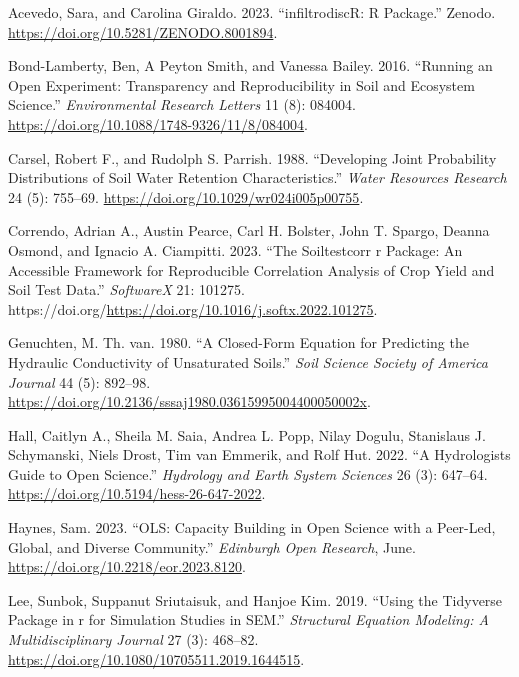 \documentclass[
]{article}
\newlength{\cslhangindent}
\newlength{\cslentryspacingunit} %
\newenvironment{CSLReferences}[2] %
 {%
  \setlength{\parindent}{0pt}
  \ifodd #1
  \let\oldpar\par
  \def\par{\hangindent=\cslhangindent\oldpar}
  \fi
  \setlength{\parskip}{#2\cslentryspacingunit}
 }%
 {}
\begin{document}
\hypertarget{refs}{}
\begin{CSLReferences}{1}{0}
\leavevmode{}%
Acevedo, Sara, and Carolina Giraldo. 2023. {``infiltrodiscR: R
Package.''} Zenodo. \url{https://doi.org/10.5281/ZENODO.8001894}.

\leavevmode{}%
Bond-Lamberty, Ben, A Peyton Smith, and Vanessa Bailey. 2016. {``Running
an Open Experiment: Transparency and Reproducibility in Soil and
Ecosystem Science.''} \emph{Environmental Research Letters} 11 (8):
084004. \url{https://doi.org/10.1088/1748-9326/11/8/084004}.

\leavevmode{}%
Carsel, Robert F., and Rudolph S. Parrish. 1988. {``Developing Joint
Probability Distributions of Soil Water Retention Characteristics.''}
\emph{Water Resources Research} 24 (5): 755--69.
\url{https://doi.org/10.1029/wr024i005p00755}.

\leavevmode{}%
Correndo, Adrian A., Austin Pearce, Carl H. Bolster, John T. Spargo,
Deanna Osmond, and Ignacio A. Ciampitti. 2023. {``The Soiltestcorr r
Package: An Accessible Framework for Reproducible Correlation Analysis
of Crop Yield and Soil Test Data.''} \emph{SoftwareX} 21: 101275.
https://doi.org/\url{https://doi.org/10.1016/j.softx.2022.101275}.

\leavevmode{}%
Genuchten, M. Th. van. 1980. {``A Closed-Form Equation for Predicting
the Hydraulic Conductivity of Unsaturated Soils.''} \emph{Soil Science
Society of America Journal} 44 (5): 892--98.
\url{https://doi.org/10.2136/sssaj1980.03615995004400050002x}.

\leavevmode{}%
Hall, Caitlyn A., Sheila M. Saia, Andrea L. Popp, Nilay Dogulu,
Stanislaus J. Schymanski, Niels Drost, Tim van Emmerik, and Rolf Hut.
2022. {``A Hydrologist{\textquotesingle}s Guide to Open Science.''}
\emph{Hydrology and Earth System Sciences} 26 (3): 647--64.
\url{https://doi.org/10.5194/hess-26-647-2022}.

\leavevmode{}%
Haynes, Sam. 2023. {``{OLS}: Capacity Building in Open Science with a
Peer-Led, Global, and Diverse Community.''} \emph{Edinburgh Open
Research}, June. \url{https://doi.org/10.2218/eor.2023.8120}.

\leavevmode{}%
Lee, Sunbok, Suppanut Sriutaisuk, and Hanjoe Kim. 2019. {``Using the
Tidyverse Package in r for Simulation Studies in {SEM}.''}
\emph{Structural Equation Modeling: A Multidisciplinary Journal} 27 (3):
468--82. \url{https://doi.org/10.1080/10705511.2019.1644515}.


\end{CSLReferences}
\end{document}
